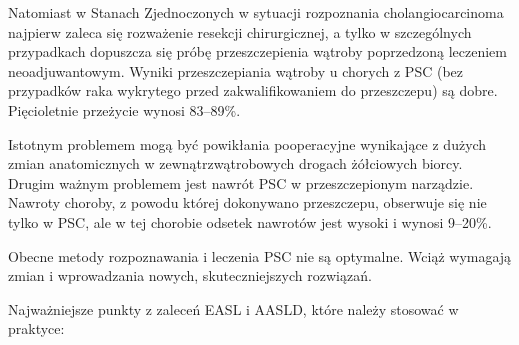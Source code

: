 Natomiast w Stanach Zjednoczonych w sytuacji rozpoznania cholangiocarcinoma najpierw zaleca się rozważenie resekcji chirurgicznej, a tylko w szczególnych przypadkach dopuszcza  się  próbę  przeszczepienia  wątroby poprzedzoną  leczeniem  neoadjuwantowym. 
Wyniki przeszczepiania wątroby u chorych z PSC (bez przypadków raka wykrytego przed zakwalifikowaniem  do  przeszczepu)  są  dobre.
Pięcioletnie przeżycie wynosi 83–89\%.

Istotnym problemem  mogą  być  powikłania  pooperacyjne  wynikające  z  dużych  zmian  anatomicznych w  zewnątrzwątrobowych  drogach  żółciowych biorcy. 
Drugim ważnym problemem jest nawrót PSC  w  przeszczepionym  narządzie.  
Nawroty choroby,  z  powodu  której  dokonywano  przeszczepu,  obserwuje  się  nie  tylko  w  PSC,  ale w  tej  chorobie  odsetek  nawrotów  jest  wysoki i wynosi 9–20\%. 

Obecne metody rozpoznawania i leczenia PSC nie są optymalne. 
Wciąż wymagają zmian i wprowadzania nowych, skuteczniejszych rozwiązań. 

\vspace{0.5cm}

Najważniejsze punkty  z  zaleceń EASL i AASLD, które należy stosować w  praktyce:

